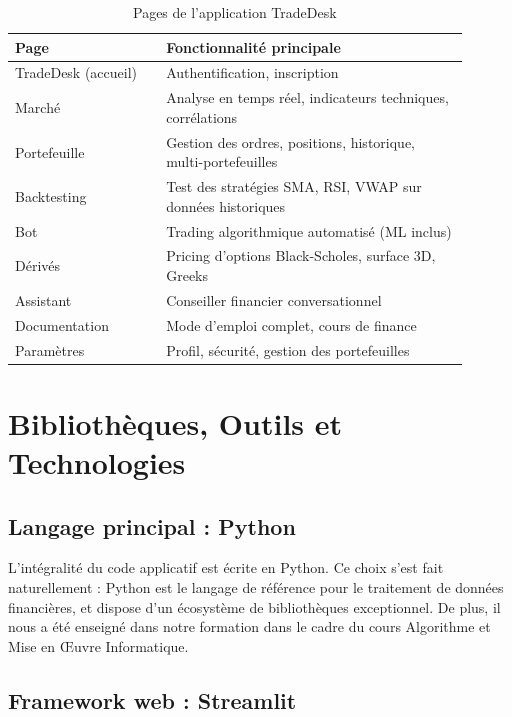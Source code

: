 \documentclass[a4paper, 12pt, twoside]{article}
\begin{document}
\begin{table}[h]
\begin{center}
\begin{tabular}{|p{0.3\linewidth}|p{0.6\linewidth}|}
\hline
\textbf{Page} & \textbf{Fonctionnalité principale} \\
\hline
TradeDesk (accueil) & Authentification, inscription \\
\hline
Marché & Analyse en temps réel, indicateurs techniques, corrélations \\
\hline
Portefeuille & Gestion des ordres, positions, historique, multi-portefeuilles \\
\hline
Backtesting & Test des stratégies SMA, RSI, VWAP sur données historiques \\
\hline
Bot & Trading algorithmique automatisé (ML inclus) \\
\hline
Dérivés & Pricing d'options Black-Scholes, surface 3D, Greeks \\
\hline
Assistant & Conseiller financier conversationnel \\
\hline
Documentation & Mode d'emploi complet, cours de finance \\
\hline
Paramètres & Profil, sécurité, gestion des portefeuilles \\
\hline
\end{tabular}
\end{center}
\caption{Pages de l'application TradeDesk}
\label{tab:pages}
\end{table}

\section{Bibliothèques, Outils et Technologies}

\subsection{Langage principal : Python}

L'intégralité du code applicatif est écrite en Python. Ce choix s'est
fait naturellement : Python est le langage de référence pour le
traitement de données financières, et dispose d'un écosystème de
bibliothèques exceptionnel. De plus, il nous a été enseigné dans notre
formation dans le cadre du cours Algorithme et Mise en Œuvre
Informatique.

\subsection{Framework web : Streamlit}
\end{document}
